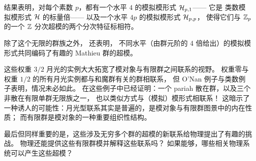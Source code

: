 

结果表明，对每个素数 $p$，都有一个水平 $4$ 的模拟模形式 ${\cal H}_{p,1}$——
它是 类数模拟模形式 ${\cal H}$  的标量倍——
以及一个水平 $4p$ 的模拟模形式 ${\cal H}_{p,p}$，
使得它们与 $\mathbb{Z}_p$ 的一个 $\mathbb{Z}$ 分次超模的两个分次特征标相符。


除了这个无限的群族之外，\cite{class_nr_moonshine} 还表明，
不同水平（由群元阶的 4 倍给出）的模拟模形式共同编码了有趣的 Mathieu 群的超模。

这些权重 $3/2$ 月光的实例大大拓宽了模对象与有限群之间联系的视野。
权重零与权重 $1/2$ 的所有月光实例都与和魔群有关的群相联系，
但 O'Nan 例子与类数例子表明，情况未必如此。
在这些例子中已经证明：一个 pariah 散在群，以及三个非散在有限单群无限族之一，
也以类似方式与（模拟）模形式相联系！
这暗示了一种诱人的可能性：月光型联系其实是普遍的，是模对象与有限群图景中的内在性质；
而有限群是模对象的一种重要组织性结构。

最后但同样重要的是，这些涉及无穷多个群的超模的新联系给物理提出了有趣的挑战。
物理还能提供这些有限群模并解释这些联系吗？
如果能够，哪些相关物理系统可以产生这些超模？
